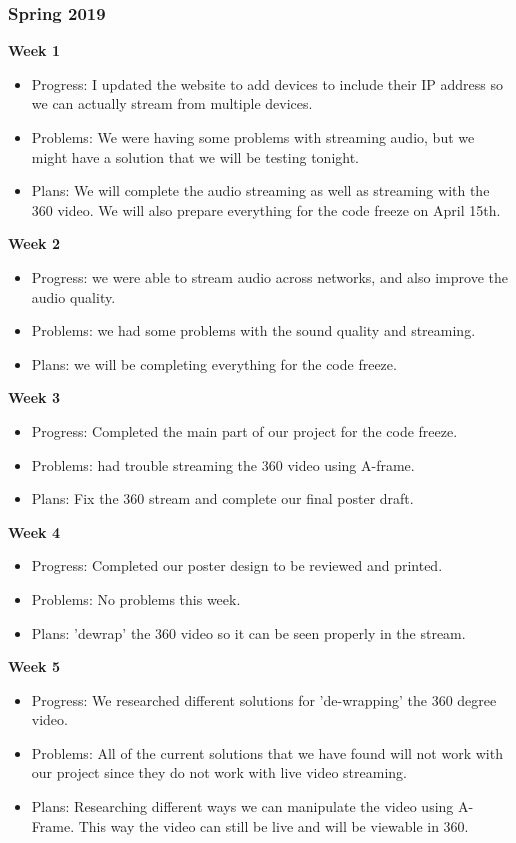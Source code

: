 \documentclass[onecolumn, draftclsnofoot,10pt, compsoc]{IEEEtran}
\begin{document}
\subsubsection{Spring 2019}
\textbf{Week 1}
\begin{itemize}
    \item Progress: I updated the website to add devices to include their IP address so we can actually stream from multiple devices.
    \item Problems: We were having some problems with streaming audio, but we might have a solution that we will be testing tonight.
    \item Plans: We will complete the audio streaming as well as streaming with the 360 video. We will also prepare everything for the code freeze on April 15th.
\end{itemize}
\textbf{Week 2}
\begin{itemize}
    \item Progress: we were able to stream audio across networks, and also improve the audio quality. 
    \item Problems: we had some problems with the sound quality and streaming.
    \item Plans: we will be completing everything for the code freeze.
\end{itemize}
\textbf{Week 3}
\begin{itemize}
    \item Progress: Completed the main part of our project for the code freeze.
    \item Problems: had trouble streaming the 360 video using A-frame.
    \item Plans: Fix the 360 stream and complete our final poster draft. 
\end{itemize}
\textbf{Week 4}
\begin{itemize}
    \item Progress: Completed our poster design to be reviewed and printed.
    \item Problems: No problems this week.
    \item Plans: 'dewrap' the 360 video so it can be seen properly in the stream. 
\end{itemize}
\textbf{Week 5}
\begin{itemize}
    \item Progress: We researched different solutions for 'de-wrapping' the 360 degree video.
    \item Problems: All of the current solutions that we have found will not work with our project since they do not work with live video streaming.
    \item Plans: Researching different ways we can manipulate the video using A-Frame. This way  the video can still be live and will be viewable in 360. 
\end{itemize}
\end{document}
